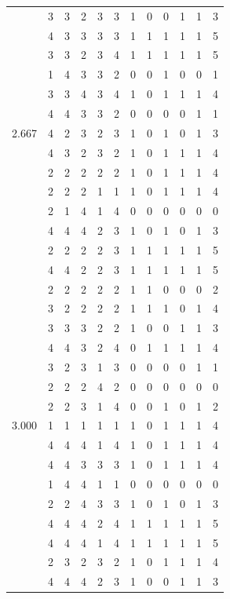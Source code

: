 \documentclass[]{msu-thesis}
\theoremstyle{definition}
\theoremstyle{definition}
\theoremstyle{definition}
\theoremstyle{remark}
\begin{document}
\begin{table}
{\begin{tabular}[t]{rrrrrrrrrrrr}
 & 3 & 3 & 2 & 3 & 3 & 1 & 0 & 0 & 1 & 1 & 3\\
 & 4 & 3 & 3 & 3 & 3 & 1 & 1 & 1 & 1 & 1 & 5\\
 & 3 & 3 & 2 & 3 & 4 & 1 & 1 & 1 & 1 & 1 & 5\\
 & 1 & 4 & 3 & 3 & 2 & 0 & 0 & 1 & 0 & 0 & 1\\
 & 3 & 3 & 4 & 3 & 4 & 1 & 0 & 1 & 1 & 1 & 4\\
 & 4 & 4 & 3 & 3 & 2 & 0 & 0 & 0 & 0 & 1 & 1\\
2.667 & 4 & 2 & 3 & 2 & 3 & 1 & 0 & 1 & 0 & 1 & 3\\
 & 4 & 3 & 2 & 3 & 2 & 1 & 0 & 1 & 1 & 1 & 4\\
 & 2 & 2 & 2 & 2 & 2 & 1 & 0 & 1 & 1 & 1 & 4\\
 & 2 & 2 & 2 & 1 & 1 & 1 & 0 & 1 & 1 & 1 & 4\\
 & 2 & 1 & 4 & 1 & 4 & 0 & 0 & 0 & 0 & 0 & 0\\
 & 4 & 4 & 4 & 2 & 3 & 1 & 0 & 1 & 0 & 1 & 3\\
 & 2 & 2 & 2 & 2 & 3 & 1 & 1 & 1 & 1 & 1 & 5\\
 & 4 & 4 & 2 & 2 & 3 & 1 & 1 & 1 & 1 & 1 & 5\\
 & 2 & 2 & 2 & 2 & 2 & 1 & 1 & 0 & 0 & 0 & 2\\
 & 3 & 2 & 2 & 2 & 2 & 1 & 1 & 1 & 0 & 1 & 4\\
 & 3 & 3 & 3 & 2 & 2 & 1 & 0 & 0 & 1 & 1 & 3\\
 & 4 & 4 & 3 & 2 & 4 & 0 & 1 & 1 & 1 & 1 & 4\\
 & 3 & 2 & 3 & 1 & 3 & 0 & 0 & 0 & 0 & 1 & 1\\
 & 2 & 2 & 2 & 4 & 2 & 0 & 0 & 0 & 0 & 0 & 0\\
 & 2 & 2 & 3 & 1 & 4 & 0 & 0 & 1 & 0 & 1 & 2\\
3.000 & 1 & 1 & 1 & 1 & 1 & 1 & 0 & 1 & 1 & 1 & 4\\
 & 4 & 4 & 4 & 1 & 4 & 1 & 0 & 1 & 1 & 1 & 4\\
 & 4 & 4 & 3 & 3 & 3 & 1 & 0 & 1 & 1 & 1 & 4\\
 & 1 & 4 & 4 & 1 & 1 & 0 & 0 & 0 & 0 & 0 & 0\\
 & 2 & 2 & 4 & 3 & 3 & 1 & 0 & 1 & 0 & 1 & 3\\
 & 4 & 4 & 4 & 2 & 4 & 1 & 1 & 1 & 1 & 1 & 5\\
 & 4 & 4 & 4 & 1 & 4 & 1 & 1 & 1 & 1 & 1 & 5\\
 & 2 & 3 & 2 & 3 & 2 & 1 & 0 & 1 & 1 & 1 & 4\\
 & 4 & 4 & 4 & 2 & 3 & 1 & 0 & 0 & 1 & 1 & 3\\

\end{tabular}}
\end{table}
\end{document}
